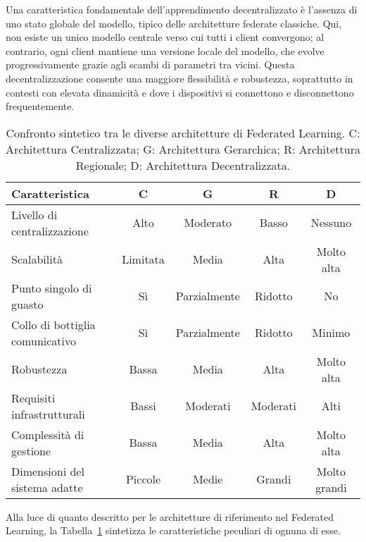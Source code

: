 \documentclass[a4paper, oneside, openright]{report}
\begin{document}
Una caratteristica fondamentale dell'apprendimento decentralizzato è l'assenza di uno stato globale del modello, tipico delle architetture federate classiche. Qui, non esiste un unico modello centrale verso cui tutti i client convergono; al contrario, ogni client mantiene una versione locale del modello, che evolve progressivamente grazie agli scambi di parametri tra vicini. Questa decentralizzazione consente una maggiore flessibilità e robustezza, soprattutto in contesti con elevata dinamicità e dove i dispositivi si connettono e disconnettono frequentemente.\\

\begin{table}[t]
\centering
\begin{tabular}{|l|c|c|c|c|}
\hline
\textbf{Caratteristica} & \textbf{C} & \textbf{G} & \textbf{R} & \textbf{D} \\
\hline
Livello di centralizzazione & Alto & Moderato & Basso & Nessuno \\
\hline
Scalabilità & Limitata & Media & Alta & Molto alta \\
\hline
Punto singolo di guasto & Sì & Parzialmente & Ridotto & No \\
\hline
Collo di bottiglia comunicativo & Sì & Parzialmente & Ridotto & Minimo \\
\hline
Robustezza & Bassa & Media & Alta & Molto alta \\
\hline
Requisiti infrastrutturali & Bassi & Moderati & Moderati & Alti \\
\hline
Complessità di gestione & Bassa & Media & Alta & Molto alta \\
\hline
Dimensioni del sistema adatte & Piccole & Medie & Grandi & Molto grandi \\
\hline
\end{tabular}
\caption{Confronto sintetico tra le diverse architetture di Federated Learning. C: Architettura Centralizzata; G: Architettura Gerarchica; R: Architettura Regionale; D: Architettura Decentralizzata. \label{tab:architectures}}
\end{table}

\noindent Alla luce di quanto descritto per le architetture di riferimento nel Federated Learning, la Tabella~\ref{tab:architectures} sintetizza le caratteristiche peculiari di ognuna di esse.
\end{document}
